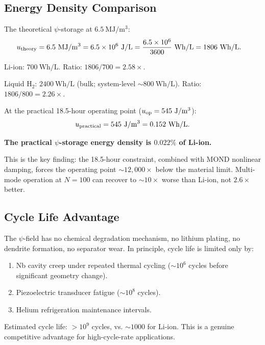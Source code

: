\documentclass[aps,prd,twocolumn,superscriptaddress]{revtex4-2}
\begin{document}
\subsection{Energy Density Comparison}

The theoretical $\psi$-storage at $6.5~\mathrm{MJ/m^3}$:
\begin{align}
u_{\rm theory} &= 6.5~\mathrm{MJ/m^3}
= 6.5\times 10^6~\mathrm{J/L}
= \frac{6.5\times 10^6}{3600}~\mathrm{Wh/L}
= 1806~\mathrm{Wh/L}.
\end{align}

Li-ion: $700~\mathrm{Wh/L}$.  Ratio: $1806/700 = 2.58\times$.

Liquid H$_2$: $2400~\mathrm{Wh/L}$ (bulk; system-level $\sim 800~\mathrm{Wh/L}$).
Ratio: $1806/800 = 2.26\times$.

At the practical 18.5-hour operating point ($u_{\rm op} = 545~\mathrm{J/m^3}$):
\begin{equation}
u_{\rm practical} = 545~\mathrm{J/m^3} = 0.152~\mathrm{Wh/L}.
\end{equation}

\textbf{The practical $\psi$-storage energy density is $0.022\%$ of Li-ion.}

This is the key finding: the 18.5-hour constraint, combined with MOND
nonlinear damping, forces the operating point $\sim 12{,}000\times$
below the material limit.  Multi-mode operation at $N = 100$ can
recover to $\sim 10\times$ worse than Li-ion, not $2.6\times$ better.

\subsection{Cycle Life Advantage}

The $\psi$-field has no chemical degradation mechanism, no lithium
plating, no dendrite formation, no separator wear.  In principle,
cycle life is limited only by:
\begin{enumerate}
\item Nb cavity creep under repeated thermal cycling ($\sim 10^6$ cycles
before significant geometry change).
\item Piezoelectric transducer fatigue ($\sim 10^8$ cycles).
\item Helium refrigeration maintenance intervals.
\end{enumerate}

Estimated cycle life: $> 10^9$ cycles, vs. $\sim 1000$ for Li-ion.
This is a genuine competitive advantage for high-cycle-rate applications.
\end{document}
